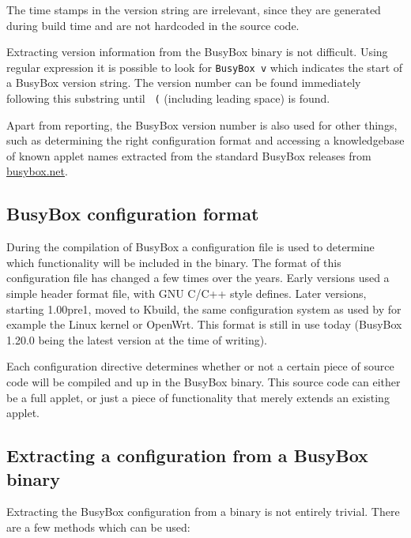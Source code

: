 \documentclass[10pt,a4paper]{article}
\begin{document}
The time stamps in the version string are irrelevant, since they are generated
during build time and are not hardcoded in the source code.

Extracting version information from the BusyBox binary is not difficult.
Using regular expression it is possible to look for \texttt{BusyBox v} which
indicates the start of a BusyBox version string. The version number can be
found immediately following this substring until \texttt{ (} (including
leading space) is found.

Apart from reporting, the BusyBox version number is also used for other
things, such as determining the right configuration format and accessing a
knowledgebase of known applet names extracted from the standard BusyBox
releases from \url{busybox.net}.

\subsection{BusyBox configuration format}

During the compilation of BusyBox a configuration file is used to determine
which functionality will be included in the binary. The format of this
configuration file has changed a few times over the years. Early versions used
a simple header format file, with GNU C/C++ style defines. Later versions,
starting 1.00pre1, moved to Kbuild, the same configuration system as used by
for example the Linux kernel or OpenWrt. This format is still in use today
(BusyBox 1.20.0 being the latest version at the time of writing).

Each configuration directive determines whether or not a certain piece of
source code will be compiled and up in the BusyBox binary. This source code can
either be a full applet, or just a piece of functionality that merely extends
an existing applet.

\subsection{Extracting a configuration from a BusyBox binary}

Extracting the BusyBox configuration from a binary is not entirely trivial.
There are a few methods which can be used:
\end{document}
